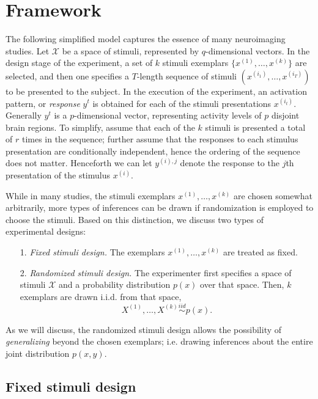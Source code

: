 \documentclass[12pt]{article}
\begin{document}
\section{Framework}

The following simplified model captures the essence of many
neuroimaging studies.  Let $\mathcal{X}$ be a space of stimuli,
represented by $q$-dimensional vectors.  In the design stage of the
experiment, a set of $k$ stimuli exemplars $\{x^{(1)},\hdots, x^{(k)}\}$ are
selected, and then one specifies a $T$-length sequence of stimuli $(
x^{(i_1)},\hdots, x^{(i_T)} )$ to be presented to the subject.  In the
execution of the experiment, an activation pattern, or \emph{response}
$y^{t}$ is obtained for each of the stimuli presentations $x^{(i_t)}$.
Generally $y^t$ is a $p$-dimensional vector, representing activity
levels of $p$ disjoint brain regions.  To simplify, assume that each
of the $k$ stimuli is presented a total of $r$ times in the sequence;
further assume that the responses to each stimulus presentation are
conditionally independent, hence the ordering of the sequence does not
matter.  Henceforth we can let $y^{(i),j}$ denote the response to the
$j$th presentation of the stimulus $x^{(i)}$.

While in many studies, the stimuli exemplars $x^{(1)},\hdots,x^{(k)}$
are chosen somewhat arbitrarily, more types of inferences can be drawn
if randomization is employed to choose the stimuli.
Based on this distinction, we discuss two types of experimental designs:
\begin{itemize}
\item[1.] \emph{Fixed stimuli design.}
The exemplars $x^{(1)},\hdots, x^{(k)}$ are treated as fixed.
\item[2.] \emph{Randomized stimuli design.}
The experimenter first specifies a space of stimuli $\mathcal{X}$
and a probability distribution $p(x)$ over that space.
Then, $k$ exemplars are drawn i.i.d. from that space,
\[
X^{(1)},\hdots, X^{(k)} \stackrel{iid}{\sim} p(x).
\]
\end{itemize}
As we will discuss, the randomized stimuli design allows the possibility of
\emph{generalizing} beyond the chosen exemplars;
i.e. drawing inferences about the entire joint distribution $p(x, y)$.

\subsection{Fixed stimuli design}

\end{document}
